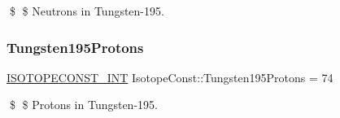 \$ \$ Neutrons in Tungsten-\/195. \mbox{\label{group___isotope_const-_tungsten-_w195_ga0b941fddcb99dbbfbc261eb11f7c7325}} 
\subsubsection{\texorpdfstring{Tungsten195\+Protons}{Tungsten195Protons}}
{\footnotesize\ttfamily \mbox{\hyperlink{group___isotope_const-_macros_ga5f18360b3e99483a35c32d789e62621c}{I\+S\+O\+T\+O\+P\+E\+C\+O\+N\+S\+T\+\_\+\+I\+NT}} Isotope\+Const\+::\+Tungsten195\+Protons = 74}

\$ \$ Protons in Tungsten-\/195. 